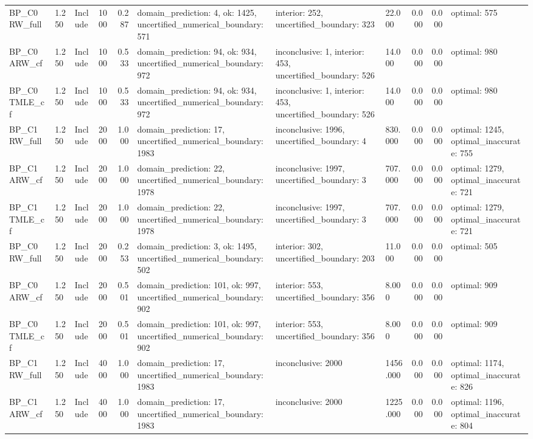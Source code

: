 \begin{tabular}{llllrlllrrl}
BP\_C0 RW\_full & 1.250 & Include & 1000 & 0.287 & domain\_prediction: 4, ok: 1425, uncertified\_numerical\_boundary: 571 & interior: 252, uncertified\_boundary: 323 & 22.000 & 0.000 & 0.000 & optimal: 575 \\
BP\_C0 ARW\_cf & 1.250 & Include & 1000 & 0.533 & domain\_prediction: 94, ok: 934, uncertified\_numerical\_boundary: 972 & inconclusive: 1, interior: 453, uncertified\_boundary: 526 & 14.000 & 0.000 & 0.000 & optimal: 980 \\
BP\_C0 TMLE\_cf & 1.250 & Include & 1000 & 0.533 & domain\_prediction: 94, ok: 934, uncertified\_numerical\_boundary: 972 & inconclusive: 1, interior: 453, uncertified\_boundary: 526 & 14.000 & 0.000 & 0.000 & optimal: 980 \\
BP\_C1 RW\_full & 1.250 & Include & 2000 & 1.000 & domain\_prediction: 17, uncertified\_numerical\_boundary: 1983 & inconclusive: 1996, uncertified\_boundary: 4 & 830.000 & 0.000 & 0.000 & optimal: 1245, optimal\_inaccurate: 755 \\
BP\_C1 ARW\_cf & 1.250 & Include & 2000 & 1.000 & domain\_prediction: 22, uncertified\_numerical\_boundary: 1978 & inconclusive: 1997, uncertified\_boundary: 3 & 707.000 & 0.000 & 0.000 & optimal: 1279, optimal\_inaccurate: 721 \\
BP\_C1 TMLE\_cf & 1.250 & Include & 2000 & 1.000 & domain\_prediction: 22, uncertified\_numerical\_boundary: 1978 & inconclusive: 1997, uncertified\_boundary: 3 & 707.000 & 0.000 & 0.000 & optimal: 1279, optimal\_inaccurate: 721 \\
BP\_C0 RW\_full & 1.250 & Include & 2000 & 0.253 & domain\_prediction: 3, ok: 1495, uncertified\_numerical\_boundary: 502 & interior: 302, uncertified\_boundary: 203 & 11.000 & 0.000 & 0.000 & optimal: 505 \\
BP\_C0 ARW\_cf & 1.250 & Include & 2000 & 0.501 & domain\_prediction: 101, ok: 997, uncertified\_numerical\_boundary: 902 & interior: 553, uncertified\_boundary: 356 & 8.000 & 0.000 & 0.000 & optimal: 909 \\
BP\_C0 TMLE\_cf & 1.250 & Include & 2000 & 0.501 & domain\_prediction: 101, ok: 997, uncertified\_numerical\_boundary: 902 & interior: 553, uncertified\_boundary: 356 & 8.000 & 0.000 & 0.000 & optimal: 909 \\
BP\_C1 RW\_full & 1.250 & Include & 4000 & 1.000 & domain\_prediction: 17, uncertified\_numerical\_boundary: 1983 & inconclusive: 2000 & 1456.000 & 0.000 & 0.000 & optimal: 1174, optimal\_inaccurate: 826 \\
BP\_C1 ARW\_cf & 1.250 & Include & 4000 & 1.000 & domain\_prediction: 17, uncertified\_numerical\_boundary: 1983 & inconclusive: 2000 & 1225.000 & 0.000 & 0.000 & optimal: 1196, optimal\_inaccurate: 804 \\

\end{tabular}

